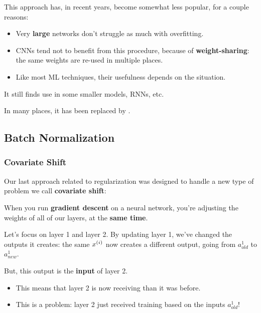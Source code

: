         

        \subsecdiv

        This approach has, in recent years, become somewhat less popular, for a couple reasons:

        \begin{itemize}
            \item Very \textbf{large} networks don't struggle as much with overfitting.
            
            \item CNNs tend not to benefit from this procedure, because of \textbf{weight-sharing}: the same weights are re-used in multiple places.

            \item Like most ML techniques, their usefulness depends on the situation.
        \end{itemize}

        It still finds use in some smaller models, RNNs, etc.

        In many places, it has been replaced by .

    \pagebreak

    \subsection{Batch Normalization}

        \subsubsection{Covariate Shift}

            Our last approach related to regularization was designed to handle a new type of problem we call \textbf{covariate shift}:
            
            When you run \textbf{gradient descent} on a neural network, you're adjusting the weights of all of our layers, at the \textbf{same time}.
    
            Let's focus on layer 1 and layer 2. By updating layer 1, we've changed the outputs it creates: the same $x^{(i)}$ now creates a different output, going from $a^1_{old}$ to $a^1_{new}$.
    
            But, this output is the \textbf{input} of layer 2.
            
            \begin{itemize}
                \item This means that layer 2 is now receiving  than it was before.
                    
                \item This is a problem: layer 2 just received training based on the  inputs $a^1_{old}$!
            \end{itemize}
    

